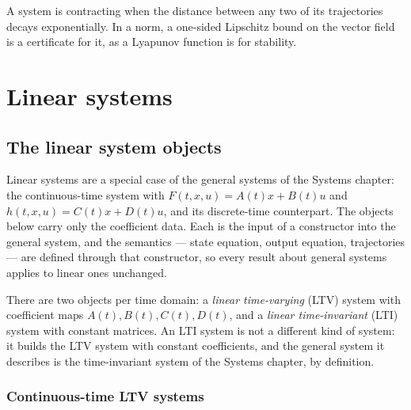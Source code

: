 A system is contracting when the distance between any two of its trajectories decays
exponentially.  In a norm, a one-sided Lipschitz bound on the vector field is a certificate for
it, as a Lyapunov function is for stability.


\chapter{Linear systems}

\section{The linear system objects}

Linear systems are a special case of the general systems of the Systems chapter: the
continuous-time system with $F(t, x, u) = A(t)x + B(t)u$ and $h(t, x, u) = C(t)x + D(t)u$, and its
discrete-time counterpart. The objects below carry only the coefficient data. Each is the input of
a constructor into the general system, and the semantics --- state equation, output equation,
trajectories --- are defined through that constructor, so every result about general systems
applies to linear ones unchanged.

There are two objects per time domain: a \emph{linear time-varying} (LTV) system with coefficient
maps $A(t), B(t), C(t), D(t)$, and a \emph{linear time-invariant} (LTI) system with constant
matrices. An LTI system is not a different kind of system: it builds the LTV system with constant
coefficients, and the general system it describes is the time-invariant system of the Systems
chapter, by definition.

\subsection{Continuous-time LTV systems}

